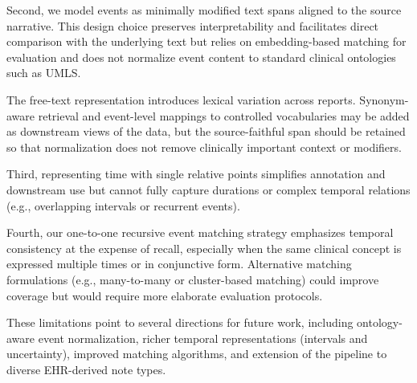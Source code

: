 \documentclass[pdflatex,sn-mathphys-num]{sn-jnl}%
\newif\ifshowrebuttalcolor
\newcommand{\rebuttal}[1]{%
  \ifshowrebuttalcolor
    \textcolor{rebuttalblue}{#1}%
  \else
    #1%
  \fi
}
\theoremstyle{thmstyleone}%
\theoremstyle{thmstyletwo}%
\theoremstyle{thmstylethree}%
\begin{document}
Second, we model events as minimally modified text spans aligned to the source narrative. This design choice preserves interpretability and facilitates direct comparison with the underlying text but relies on embedding-based matching for evaluation and does not normalize event content to standard clinical ontologies such as UMLS. \rebuttal{The free-text representation introduces lexical variation across reports. Synonym-aware retrieval and event-level mappings to controlled vocabularies may be added as downstream views of the data, but the source-faithful span should be retained so that normalization does not remove clinically important context or modifiers.}

Third, representing time with single relative points simplifies annotation and downstream use but cannot fully capture durations or complex temporal relations (e.g., overlapping intervals or recurrent events).

Fourth, our one-to-one recursive event matching strategy emphasizes temporal consistency at the expense of recall, especially when the same clinical concept is expressed multiple times or in conjunctive form.  Alternative matching formulations (e.g., many-to-many or cluster-based matching) could improve coverage but would require more elaborate evaluation protocols. 

These limitations point to several directions for future work, including ontology-aware event normalization, richer temporal representations (intervals and uncertainty), improved matching algorithms, and extension of the pipeline to diverse EHR-derived note types.




\end{document}
